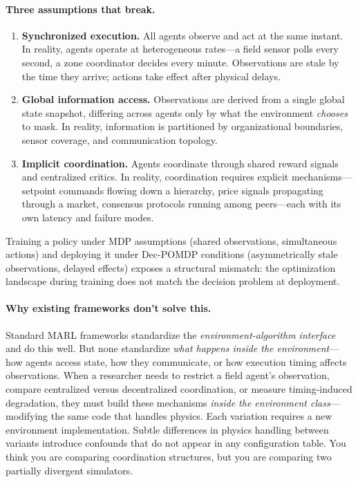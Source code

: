 \documentclass{article}
\begin{document}
\paragraph{Three assumptions that break.}
\begin{enumerate}[nosep,leftmargin=*]
    \item \textbf{Synchronized execution.} All agents observe and act at the same instant. In reality, agents operate at heterogeneous rates---a field sensor polls every second, a zone coordinator decides every minute. Observations are stale by the time they arrive; actions take effect after physical delays.
    \item \textbf{Global information access.} Observations are derived from a single global state snapshot, differing across agents only by what the environment \emph{chooses} to mask. In reality, information is partitioned by organizational boundaries, sensor coverage, and communication topology.
    \item \textbf{Implicit coordination.} Agents coordinate through shared reward signals and centralized critics. In reality, coordination requires explicit mechanisms---setpoint commands flowing down a hierarchy, price signals propagating through a market, consensus protocols running among peers---each with its own latency and failure modes.
\end{enumerate}

Training a policy under MDP assumptions (shared observations, simultaneous actions) and deploying it under Dec-POMDP conditions (asymmetrically stale observations, delayed effects) exposes a structural mismatch: the optimization landscape during training does not match the decision problem at deployment.

\paragraph{Why existing frameworks don't solve this.}
Standard MARL frameworks standardize the \emph{environment-algorithm interface} and do this well. But none standardize \emph{what happens inside the environment}---how agents access state, how they communicate, or how execution timing affects observations. When a researcher needs to restrict a field agent's observation, compare centralized versus decentralized coordination, or measure timing-induced degradation, they must build these mechanisms \emph{inside the environment class}---modifying the same code that handles physics. Each variation requires a new environment implementation. Subtle differences in physics handling between variants introduce confounds that do not appear in any configuration table. You think you are comparing coordination structures, but you are comparing two partially divergent simulators.
\end{document}
